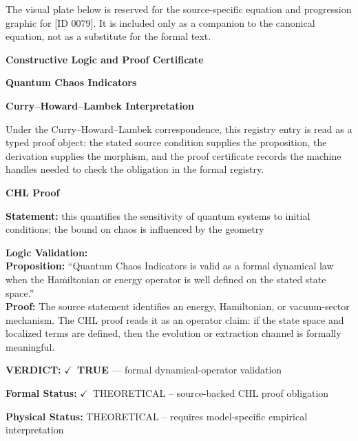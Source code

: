 \begingroup\footnotesize\sloppy
The visual plate below is reserved for the source-specific equation and progression graphic for [ID 0079]. It is included only as a companion to the canonical equation, not as a substitute for the formal text.
\par\endgroup
\ifTZPDarkEdition
{}
\fi

\clearpage
\begingroup\tzpsupportsetup
\noindent\textbf{\fontsize{10.8pt}{12.8pt}\selectfont [ID 0079] Constructive Logic and Proof Certificate}\par
\noindent\textbf{\fontsize{10pt}{12pt}\selectfont Quantum Chaos Indicators}\par
\vspace{0.45em}
\begingroup
\footnotesize
\setlength{\parskip}{0.22em}
\setlength{\parindent}{0pt}
\noindent\textbf{Curry--Howard--Lambek Interpretation}\par
Under the Curry--Howard--Lambek correspondence, this registry entry is read as a typed proof
object: the stated source condition supplies the proposition, the derivation supplies the
morphism, and the proof certificate records the machine handles needed to check the obligation
in the formal registry.

\vspace{0.45em}
\noindent\textbf{CHL Proof}\par
\textbf{Statement:} this quantifies the sensitivity of quantum systems to initial conditions; the bound on
chaos is influenced by the geometry

\textbf{Logic Validation:}\\
\textbf{Proposition:} ``Quantum Chaos Indicators is valid as a formal dynamical law when the Hamiltonian or
energy operator is well defined on the stated state space.''\\
\textbf{Proof:} The source statement identifies an energy, Hamiltonian, or vacuum-sector mechanism. The
CHL proof reads it as an operator claim: if the state space and localized terms are
defined, then the evolution or extraction channel is formally meaningful.

\textbf{VERDICT:} \ensuremath{\checkmark}\ \textbf{TRUE} --- formal dynamical-operator validation

\textbf{Formal Status:} \ensuremath{\checkmark}\ THEORETICAL -- source-backed CHL proof obligation

\textbf{Physical Status:} THEORETICAL -- requires model-specific empirical interpretation
\par\vspace{0.45em}
\par
\ifTZPDarkEdition
{}
\fi
\endgroup
\endgroup
